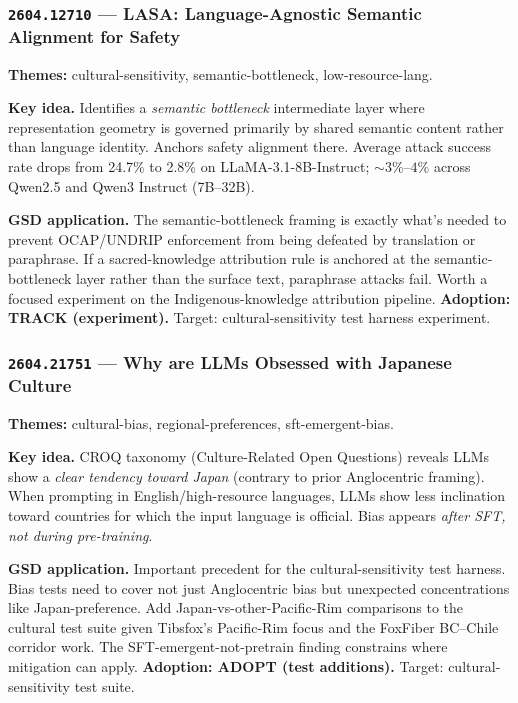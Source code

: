 \documentclass[11pt,letterpaper]{article}
\newcommand{\arxivid}[1]{\texttt{\textcolor{accent}{#1}}}
\newcommand{\paperhead}[2]{\noindent\textbf{\sffamily\textcolor{secondary}{#1}} \textemdash{} #2}
\begin{document}
\subsubsection{\arxivid{2604.12710} --- LASA: Language-Agnostic Semantic Alignment for Safety}

\paperhead{Themes:}{cultural-sensitivity, semantic-bottleneck, low-resource-lang.}

\textbf{Key idea.} Identifies a \textit{semantic bottleneck} intermediate layer where representation geometry is governed primarily by shared semantic content rather than language identity. Anchors safety alignment there. Average attack success rate drops from 24.7\% to 2.8\% on LLaMA-3.1-8B-Instruct; ${\sim}3\%$--$4\%$ across Qwen2.5 and Qwen3 Instruct (7B--32B).

\textbf{GSD application.} The semantic-bottleneck framing is exactly what's needed to prevent OCAP/UNDRIP enforcement from being defeated by translation or paraphrase. If a sacred-knowledge attribution rule is anchored at the semantic-bottleneck layer rather than the surface text, paraphrase attacks fail. Worth a focused experiment on the Indigenous-knowledge attribution pipeline. \textbf{Adoption: TRACK (experiment).} Target: cultural-sensitivity test harness experiment.

\subsubsection{\arxivid{2604.21751} --- Why are LLMs Obsessed with Japanese Culture}

\paperhead{Themes:}{cultural-bias, regional-preferences, sft-emergent-bias.}

\textbf{Key idea.} CROQ taxonomy (Culture-Related Open Questions) reveals LLMs show a \textit{clear tendency toward Japan} (contrary to prior Anglocentric framing). When prompting in English/high-resource languages, LLMs show less inclination toward countries for which the input language is official. Bias appears \textit{after SFT, not during pre-training}.

\textbf{GSD application.} Important precedent for the cultural-sensitivity test harness. Bias tests need to cover not just Anglocentric bias but unexpected concentrations like Japan-preference. Add Japan-vs-other-Pacific-Rim comparisons to the cultural test suite given Tibsfox's Pacific-Rim focus and the FoxFiber BC--Chile corridor work. The SFT-emergent-not-pretrain finding constrains where mitigation can apply. \textbf{Adoption: ADOPT (test additions).} Target: cultural-sensitivity test suite.
\end{document}
